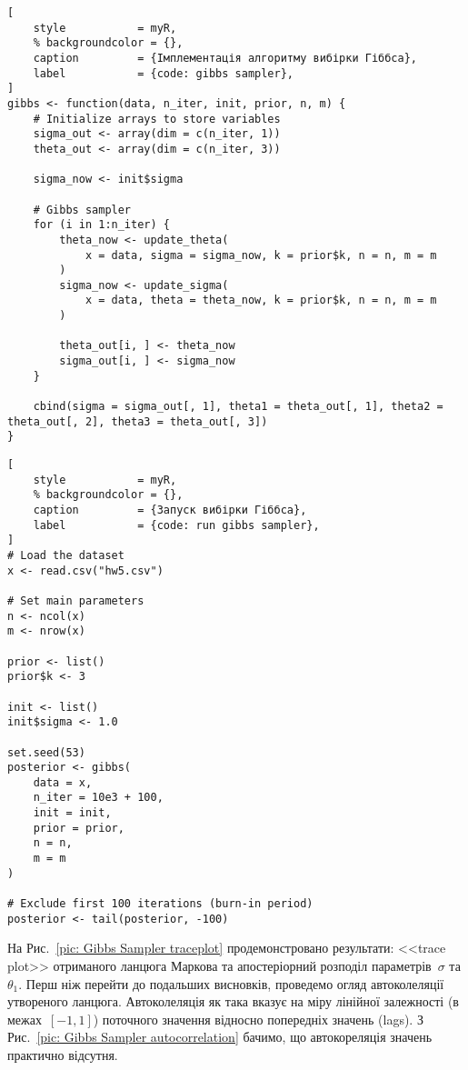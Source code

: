 \vspace{0.4cm}
\begin{lstlisting}[
    style           = myR, 
    % backgroundcolor = {},
    caption         = {Імплементація алгоритму вибірки Гіббса},
    label           = {code: gibbs sampler},
]
gibbs <- function(data, n_iter, init, prior, n, m) {
    # Initialize arrays to store variables
    sigma_out <- array(dim = c(n_iter, 1))
    theta_out <- array(dim = c(n_iter, 3))

    sigma_now <- init$sigma

    # Gibbs sampler
    for (i in 1:n_iter) {
        theta_now <- update_theta(
            x = data, sigma = sigma_now, k = prior$k, n = n, m = m
        )
        sigma_now <- update_sigma(
            x = data, theta = theta_now, k = prior$k, n = n, m = m
        )

        theta_out[i, ] <- theta_now
        sigma_out[i, ] <- sigma_now
    }

    cbind(sigma = sigma_out[, 1], theta1 = theta_out[, 1], theta2 = theta_out[, 2], theta3 = theta_out[, 3])
}
\end{lstlisting}

\vspace{0.4cm}
\begin{lstlisting}[
    style           = myR, 
    % backgroundcolor = {},
    caption         = {Запуск вибірки Гіббса},
    label           = {code: run gibbs sampler},
]
# Load the dataset
x <- read.csv("hw5.csv")

# Set main parameters
n <- ncol(x)
m <- nrow(x)

prior <- list()
prior$k <- 3

init <- list()
init$sigma <- 1.0

set.seed(53)
posterior <- gibbs(
    data = x,
    n_iter = 10e3 + 100,
    init = init,
    prior = prior,
    n = n,
    m = m
)

# Exclude first 100 iterations (burn-in period)
posterior <- tail(posterior, -100)
\end{lstlisting}

\vspace{0.4cm}
На Рис.~\ref{pic: Gibbs Sampler traceplot} продемонстровано результати: <<trace plot>> отриманого ланцюга Маркова та апостеріорний розподіл параметрів~$\sigma$ та $\theta_1$. Перш ніж перейти до подальших висновків, проведемо огляд автоколеляції утвореного ланцюга. Автоколеляція як така вказує на міру лінійної залежності (в межах~$[-1,1]$) поточного значення відносно попередніх значень (lags). З Рис.~\ref{pic: Gibbs Sampler autocorrelation} бачимо, що автокореляція значень практично відсутня.  

